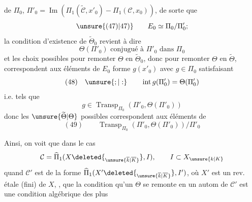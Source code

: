de $\Pi_0$, $\Pi'_0=\operatorname{Im}(\Pi_1(\widetilde{\mathcal C},x'_0)\mathbin{-}\Pi_1(\mathcal C,x_0))$, de sorte que 
\[
\unsure{(47)|47)}\qquad E_0\simeq\Pi_0/\Pi'_0;
\]
la condition d'existence de $\widetilde{\Theta}_0$ revient à dire
\[
\Theta(\Pi'_0)\text{ conjugué à }\Pi'_0\text{ dans }\Pi_0
\]
et les choix possibles pour remonter $\Theta$ en $\widetilde{\Theta}_0$, donc pour remonter $\Theta$ en $\widetilde{\Theta}$, correspondent aux éléments  de $E_0$   forme $g(x'_0)$ avec $g\in\Pi_0$ satisfaisant
\[
(48)\quad\unsure{;|:}\qquad \operatorname{int}g(\Pi'_0)=\Theta(\Pi'_0)
\]
i.e. tels que
\[
g\in\operatorname{Transp}_{\Pi_0}(\Pi'_0,\Theta(\Pi'_0))
\]
donc les $\unsure{\widetilde{\Theta}|\Theta}$ possibles correspondent aux éléments de
\[
(49)\qquad \operatorname{Transp}_{\Pi_0}(\Pi'_0,\Theta(\Pi'_0))/\Pi'_0
\]

Ainsi, on voit que dans le cas 
\[
\mathcal C=\widehat{\Pi}_1(X\deleted{_{\unsure{\overline{k}|\overline K}}},I),\qquad I\subset X_{\unsure{k|K}}
\]
quand $\mathcal C'$  est de la forme $\widehat{\Pi}_1(X'\deleted{_{\unsure{\overline{k}|\overline K}}},I')$, où $X'$ est un rev. étale (fini) de $X$, , que la condition qu'un  $\Theta$  se remonte en un autom de $\mathcal C'$ est une condition algébrique des plus

